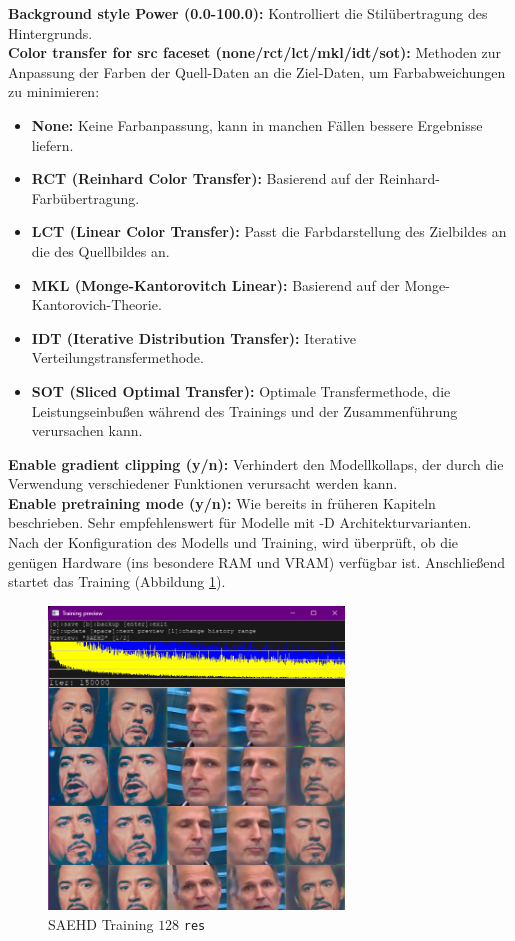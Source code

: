 \textbf{Background style Power (0.0-100.0):} Kontrolliert die Stilübertragung des Hintergrunds.\\
\textbf{Color transfer for src faceset (none/rct/lct/mkl/idt/sot):} Methoden zur Anpassung der Farben der Quell-Daten an die Ziel-Daten, um Farbabweichungen zu minimieren:
\begin{itemize}
    \item \textbf{None:} Keine Farbanpassung, kann in manchen Fällen bessere Ergebnisse liefern.
    \item \textbf{RCT (Reinhard Color Transfer):} Basierend auf der Reinhard-Farbübertragung.
    \item \textbf{LCT (Linear Color Transfer):} Passt die Farbdarstellung des Zielbildes an die des Quellbildes an.
    \item \textbf{MKL (Monge-Kantorovitch Linear):} Basierend auf der Monge-Kantorovich-Theorie.
    \item \textbf{IDT (Iterative Distribution Transfer):} Iterative Verteilungstransfermethode.
    \item \textbf{SOT (Sliced Optimal Transfer):} Optimale Transfermethode, die Leistungseinbußen während des Trainings und der Zusammenführung verursachen kann.
\end{itemize}
\textbf{Enable gradient clipping (y/n):} Verhindert den Modellkollaps, der durch die Verwendung verschiedener Funktionen verursacht werden kann.\\
\textbf{Enable pretraining mode (y/n):} Wie bereits in früheren Kapiteln beschrieben.
Sehr empfehlenswert für Modelle mit -D Architekturvarianten.\\[0.5cm]

Nach der Konfiguration des Modells und Training, wird überprüft, ob die genügen Hardware (ins besondere RAM und VRAM) verfügbar ist.
Anschließend startet das Training (Abbildung \ref{fig:saehd-training}).
\begin{figure}
    \center
    \includegraphics[width=0.7\textwidth]{Bilder/DFL/saehd-train-f}
    \caption{SAEHD Training $128$ \texttt{res}}
    \label{fig:saehd-training}
\end{figure}


